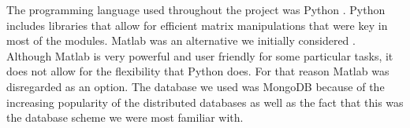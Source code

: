 \documentclass[a4paper,11pt]{article}
\begin{document}
The programming language used throughout the project was Python \cite{python}. Python includes libraries that allow for efficient matrix manipulations that were key in most of the modules. Matlab was an alternative we initially considered \cite{matlab}. Although Matlab is very powerful and user friendly for some particular tasks, it does not allow for the flexibility that Python does. For that reason Matlab was disregarded as an option.
The database we used was MongoDB because of the increasing popularity of the distributed databases as well as the fact that this was the database scheme we were most familiar with.
\end{document}
